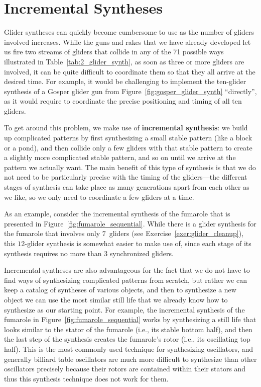 \section{Incremental Syntheses}\label{sec:incremental_synthesis}

Glider syntheses can quickly become cumbersome to use as the number of gliders involved increases. While the guns and rakes that we have already developed let us fire two streams of gliders that collide in any of the 71 possible ways illustrated in Table~\ref{tab:2_glider_synth}, as soon as three or more gliders are involved, it can be quite difficult to coordinate them so that they all arrive at the desired time. For example, it would be challenging to implement the ten-glider synthesis of a Gosper glider gun from Figure~\ref{fig:gosper_glider_synth} ``directly'', as it would require to coordinate the precise positioning and timing of all ten gliders.

To get around this problem, we make use of \textbf{incremental synthesis}: we build up complicated patterns by first synthesizing a small stable pattern (like a block or a pond), and then collide only a few gliders with that stable pattern to create a slightly more complicated stable pattern, and so on until we arrive at the pattern we actually want. The main benefit of this type of synthesis is that we do not need to be particularly precise with the timing of the gliders---the different stages of synthesis can take place as many generations apart from each other as we like, so we only need to coordinate a few gliders at a time.

As an example, consider the incremental synthesis of the fumarole that is presented in Figure~\ref{fig:fumarole_sequential}. While there is a glider synthesis for the fumarole that involves only $7$~gliders (see Exercise~\ref{exer:glider_cleanup}), this $12$-glider synthesis is somewhat easier to make use of, since each stage of its synthesis requires no more than $3$ synchronized gliders.

Incremental syntheses are also advantageous for the fact that we do not have to find ways of synthesizing complicated patterns from scratch, but rather we can keep a catalog of syntheses of various objects, and then to synthesize a new object we can use the most similar still life that we already know how to synthesize as our starting point. For example, the incremental synthesis of the fumarole in Figure~\ref{fig:fumarole_sequential} works by synthesizing a still life that looks similar to the stator of the fumarole (i.e., its stable bottom half), and then the last step of the synthesis creates the fumarole's rotor (i.e., its oscillating top half). This is the most commonly-used technique for synthesizing oscillators, and generally billiard table oscillators are much more difficult to synthesize than other oscillators precisely because their rotors are contained within their stators and thus this synthesis technique does not work for them.

